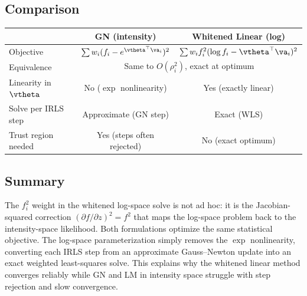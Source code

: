 \subsection{Comparison}

\begin{center}
\renewcommand{\arraystretch}{1.3}
\begin{tabular}{lcc}
\hline
& \textbf{GN (intensity)} & \textbf{Whitened Linear (log)} \\
\hline
Objective & $\sum w_i(f_i - e^{\vtheta^\top\va_i})^2$
          & $\sum w_i f_i^2(\log f_i - \vtheta^\top\va_i)^2$ \\
Equivalence & \multicolumn{2}{c}{Same to $O(\rho_i^2)$, exact at optimum} \\
Linearity in $\vtheta$ & No ($\exp$ nonlinearity) & Yes (exactly linear) \\
Solve per IRLS step & Approximate (GN step) & Exact (WLS) \\
Trust region needed & Yes (steps often rejected) & No (exact optimum) \\
\hline
\end{tabular}
\end{center}

\subsection{Summary}

The $f_i^2$ weight in the whitened log-space solve is not ad hoc: it is
the Jacobian-squared correction $(\partial f/\partial z)^2 = f^2$ that
maps the log-space problem back to the intensity-space likelihood.  Both
formulations optimize the same statistical objective.  The log-space
parameterization simply removes the $\exp$ nonlinearity, converting each
IRLS step from an approximate Gauss--Newton update into an exact
weighted least-squares solve.  This explains why the whitened linear
method converges reliably while GN and LM in intensity space struggle
with step rejection and slow convergence.
